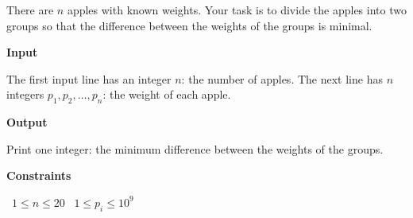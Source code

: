 There are $n$ apples with known weights. Your task is to divide the apples into two groups so that the difference between the weights of the groups is minimal.

\vspace{0.3cm}\noindent\textbf{Input}

The first input line has an integer $n$: the number of apples.
The next line has $n$ integers $p_1,p_2,\dots,p_n$: the weight of each apple.

\vspace{0.3cm}\noindent\textbf{Output}

Print one integer: the minimum difference between the weights of the groups.

\vspace{0.3cm}\noindent\textbf{Constraints}

\textbullet\ $1 \le n \le 20$
\textbullet\ $1 \le p_i \le 10^9$